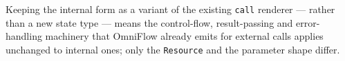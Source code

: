 Keeping the internal form as a variant of the existing \texttt{call} renderer --- rather than a new
state type --- means the control-flow, result-passing and error-handling machinery that OmniFlow
already emits for external calls applies unchanged to internal ones; only the \texttt{Resource} and
the parameter shape differ.









































































































































